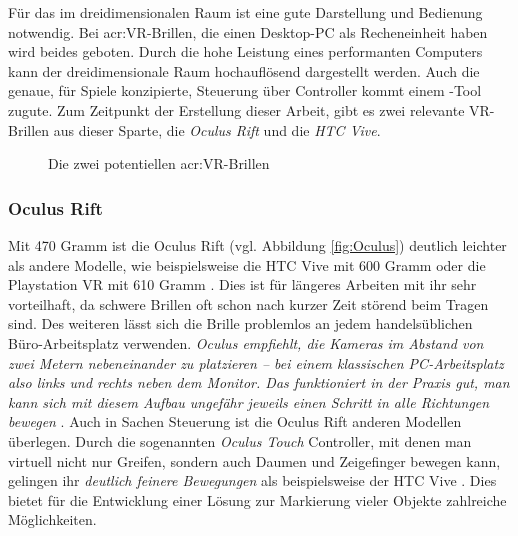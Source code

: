 Für das  im dreidimensionalen Raum ist eine gute Darstellung und Bedienung notwendig. Bei \acrshort{acr:VR}-Brillen, die einen Desktop-PC als Recheneinheit haben wird beides geboten. Durch die hohe Leistung eines performanten Computers kann der dreidimensionale Raum hochauflösend dargestellt werden. Auch die genaue, für Spiele konzipierte, Steuerung über Controller kommt einem -Tool zugute. Zum Zeitpunkt der Erstellung dieser Arbeit, gibt es zwei relevante VR-Brillen aus dieser Sparte, die \textit{Oculus Rift} und die \textit{HTC Vive}.

\begin{figure}%
    \centering
    \qquad
    \caption{Die zwei potentiellen \acrshort{acr:VR}-Brillen}\label{fig:VR-Brillen}%
\end{figure}

\subsubsection{Oculus Rift}
Mit 470 Gramm ist die Oculus Rift (vgl. Abbildung \ref{fig:Oculus}) deutlich leichter als andere Modelle, wie beispielsweise die HTC Vive mit 600 Gramm oder die Playstation VR mit 610 Gramm \cite{bib:OculusTestTragekomfort}. Dies ist für längeres Arbeiten mit ihr sehr vorteilhaft, da schwere Brillen oft schon nach kurzer Zeit störend beim Tragen sind. Des weiteren lässt sich die Brille problemlos an jedem handelsüblichen Büro-Arbeitsplatz verwenden. \textit{\glqq Oculus empfiehlt, die Kameras im Abstand von zwei Metern nebeneinander zu platzieren – bei einem klassischen PC-Arbeitsplatz also links und rechts neben dem Monitor. Das funktioniert in der Praxis gut, man kann sich mit diesem Aufbau ungefähr jeweils einen Schritt in alle Richtungen bewegen\grqq} \cite{bib:OculusTouchTest}. Auch in Sachen Steuerung ist die Oculus Rift anderen Modellen überlegen. Durch die sogenannten \textit{Oculus Touch} Controller, mit denen man virtuell nicht nur Greifen, sondern auch Daumen und Zeigefinger bewegen kann, gelingen ihr \textit{\glqq deutlich feinere Bewegungen\grqq} als beispielsweise der HTC Vive \cite{bib:OculusTouchTest}. Dies bietet für die Entwicklung einer Lösung zur Markierung vieler Objekte zahlreiche Möglichkeiten.\\

